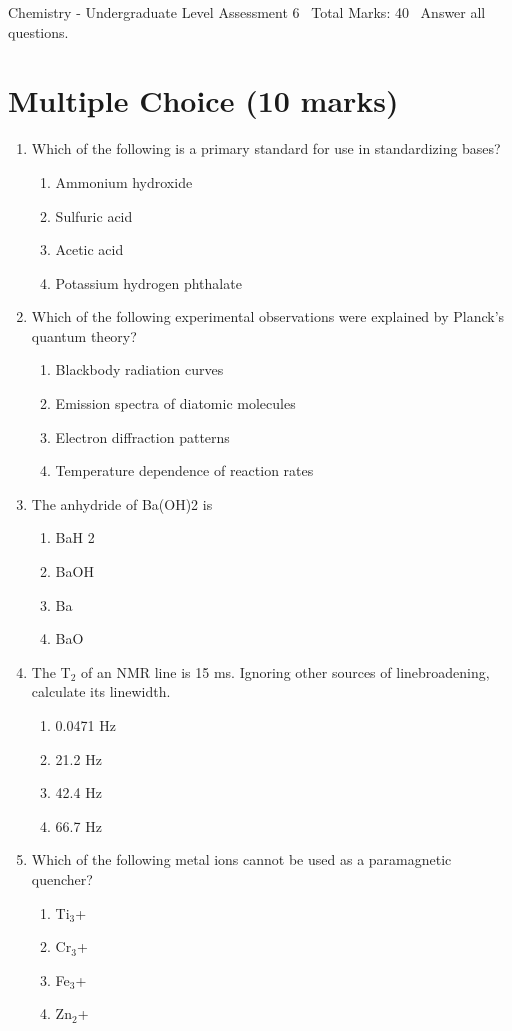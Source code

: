 \documentclass[12pt]{article}
\begin{document}
\begin{center}
Chemistry - Undergraduate Level Assessment 6 \
Total Marks: 40 \
Answer all questions.
\end{center}

\section*{Multiple Choice (10 marks)}
\begin{enumerate}[label=\arabic*.]
\item Which of the following is a primary standard for use in standardizing bases?
\begin{enumerate}[label=(\alph*)]
    \item Ammonium hydroxide
    \item Sulfuric acid
    \item Acetic acid
    \item Potassium hydrogen phthalate
\end{enumerate}
\item Which of the following experimental observations were explained by Planck's quantum theory?
\begin{enumerate}[label=(\alph*)]
    \item Blackbody radiation curves
    \item Emission spectra of diatomic molecules
    \item Electron diffraction patterns
    \item Temperature dependence of reaction rates
\end{enumerate}
\item The anhydride of Ba(OH)2 is
\begin{enumerate}[label=(\alph*)]
    \item BaH 2
    \item BaOH
    \item Ba
    \item BaO
\end{enumerate}
\item The T$_{2}$ of an NMR line is 15 ms. Ignoring other sources of linebroadening, calculate its linewidth.
\begin{enumerate}[label=(\alph*)]
    \item 0.0471 Hz
    \item 21.2 Hz
    \item 42.4 Hz
    \item 66.7 Hz
\end{enumerate}
\item Which of the following metal ions cannot be used as a paramagnetic quencher?
\begin{enumerate}[label=(\alph*)]
    \item Ti$_{3}$+
    \item Cr$_{3}$+
    \item Fe$_{3}$+
    \item Zn$_{2}$+
\end{enumerate}
\end{enumerate}
\end{document}
